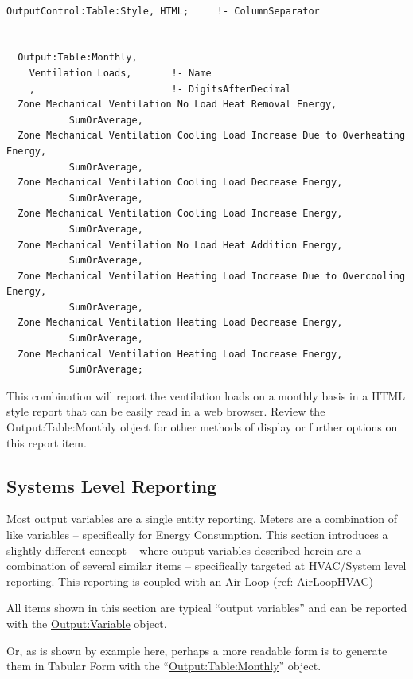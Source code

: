 \begin{lstlisting}

OutputControl:Table:Style, HTML;     !- ColumnSeparator


  Output:Table:Monthly,
    Ventilation Loads,       !- Name
    ,                        !- DigitsAfterDecimal
  Zone Mechanical Ventilation No Load Heat Removal Energy,
           SumOrAverage,
  Zone Mechanical Ventilation Cooling Load Increase Due to Overheating Energy,
           SumOrAverage,
  Zone Mechanical Ventilation Cooling Load Decrease Energy,
           SumOrAverage,
  Zone Mechanical Ventilation Cooling Load Increase Energy,
           SumOrAverage,
  Zone Mechanical Ventilation No Load Heat Addition Energy,
           SumOrAverage,
  Zone Mechanical Ventilation Heating Load Increase Due to Overcooling Energy,
           SumOrAverage,
  Zone Mechanical Ventilation Heating Load Decrease Energy,
           SumOrAverage,
  Zone Mechanical Ventilation Heating Load Increase Energy,
           SumOrAverage;
\end{lstlisting}

This combination will report the ventilation loads on a monthly basis in a HTML style report that can be easily read in a web browser. Review the Output:Table:Monthly object for other methods of display or further options on this report item.

\subsection{Systems Level Reporting}\label{systems-level-reporting}

Most output variables are a single entity reporting. Meters are a combination of like variables -- specifically for Energy Consumption. This section introduces a slightly different concept -- where output variables described herein are a combination of several similar items -- specifically targeted at HVAC/System level reporting. This reporting is coupled with an Air Loop (ref: \hyperref[airloophvac]{AirLoopHVAC})

All items shown in this section are typical ``output variables'' and can be reported with the \hyperref[outputvariable]{Output:Variable} object.

Or, as is shown by example here, perhaps a more readable form is to generate them in Tabular Form with the ``\hyperref[outputtablemonthly]{Output:Table:Monthly}'' object.

